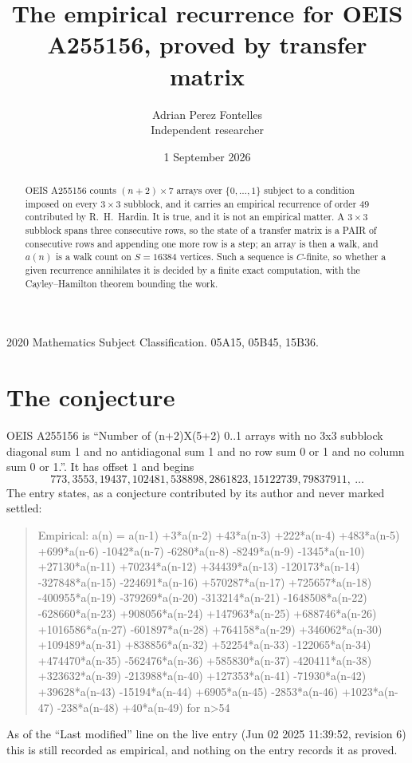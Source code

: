 \documentclass[11pt,a4paper]{article}
\title{The empirical recurrence for OEIS A255156, proved by transfer matrix}
\author{Adrian Perez Fontelles\\ \small Independent researcher}
\date{1 September 2026}
\theoremstyle{plain}
\theoremstyle{definition}
\begin{document}
\maketitle

\begin{abstract}
OEIS A255156 counts $(n+2)\times7$ arrays over $\{0,\dots,1\}$ subject to a condition imposed on
every $3\times3$ subblock, and it carries an empirical recurrence of order $49$
contributed by R.~H.~Hardin. It is true, and it is not an empirical matter. A $3\times3$
subblock spans three consecutive rows, so the state of a transfer matrix is a PAIR of
consecutive rows and appending one more row is a step; an array is then a walk, and
$a(n)$ is a walk count on $S=16384$ vertices. Such a sequence is $C$-finite, so whether a given
recurrence annihilates it is decided by a finite exact computation, with the Cayley--Hamilton
theorem bounding the work.
\end{abstract}

\noindent\small 2020 Mathematics Subject Classification. 05A15, 05B45, 15B36.\normalsize

\section{The conjecture}

OEIS A255156 is ``Number of (n+2)X(5+2) 0..1 arrays with no 3x3 subblock diagonal sum 1 and no antidiagonal sum 1 and no row sum 0 or 1 and no column sum 0 or 1.''. It has offset $1$ and begins
\[
773, 3553, 19437, 102481, 538898, 2861823, 15122739, 79837911,\ \dots
\]
The entry states, as a conjecture contributed by its author and never marked settled:
\begin{quote}
Empirical: a(n) = a(n-1) +3*a(n-2) +43*a(n-3) +222*a(n-4) +483*a(n-5) +699*a(n-6) -1042*a(n-7) -6280*a(n-8) -8249*a(n-9) -1345*a(n-10) +27130*a(n-11) +70234*a(n-12) +34439*a(n-13) -120173*a(n-14) -327848*a(n-15) -224691*a(n-16) +570287*a(n-17) +725657*a(n-18) -400955*a(n-19) -379269*a(n-20) -313214*a(n-21) -1648508*a(n-22) -628660*a(n-23) +908056*a(n-24) +147963*a(n-25) +688746*a(n-26) +1016586*a(n-27) -601897*a(n-28) +764158*a(n-29) +346062*a(n-30) +109489*a(n-31) +838856*a(n-32) +52254*a(n-33) -122065*a(n-34) +474470*a(n-35) -562476*a(n-36) +585830*a(n-37) -420411*a(n-38) +323632*a(n-39) -213988*a(n-40) +127353*a(n-41) -71930*a(n-42) +39628*a(n-43) -15194*a(n-44) +6905*a(n-45) -2853*a(n-46) +1023*a(n-47) -238*a(n-48) +40*a(n-49) for n>54
\end{quote}
As of the ``Last modified'' line on the live entry (Jun 02 2025 11:39:52, revision 6) this is still
recorded as empirical, and nothing on the entry records it as proved.
\end{document}
